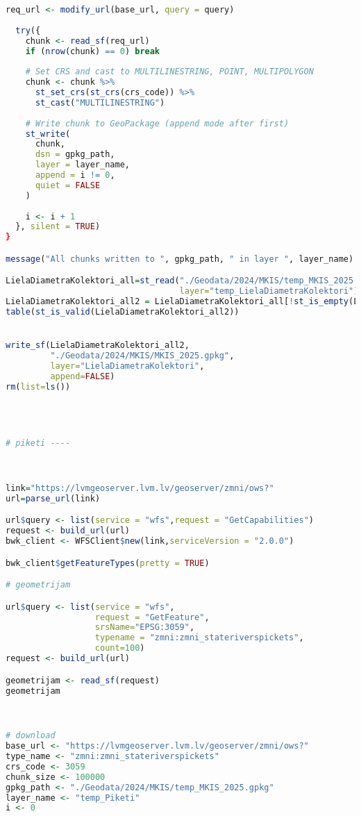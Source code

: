 \documentclass[
]{book}
\begin{document}
\begin{lstlisting}[language=R]
  req_url <- modify_url(base_url, query = query)
  
  try({
    chunk <- read_sf(req_url)
    if (nrow(chunk) == 0) break
    
    # Set CRS and cast to MULTILINESTRING, POINT, MULTIPOLYGON
    chunk <- chunk %>%
      st_set_crs(st_crs(crs_code)) %>%
      st_cast("MULTILINESTRING")
    
    # Write chunk to GeoPackage (append mode after first)
    st_write(
      chunk, 
      dsn = gpkg_path,
      layer = layer_name,
      append = i != 0,
      quiet = FALSE
    )
    
    i <- i + 1
  }, silent = TRUE)
}

message("All chunks written to ", gpkg_path, " in layer ", layer_name)

LielaDiametraKolektori_all=st_read("./Geodata/2024/MKIS/temp_MKIS_2025.gpkg",
                                   layer="temp_LielaDiametraKolektori")
LielaDiametraKolektori_all2 = LielaDiametraKolektori_all[!st_is_empty(LielaDiametraKolektori_all),,drop=FALSE] # 0
table(st_is_valid(LielaDiametraKolektori_all2))


write_sf(LielaDiametraKolektori_all2,
         "./Geodata/2024/MKIS/MKIS_2025.gpkg",
         layer="LielaDiametraKolektori",
         append=FALSE)
rm(list=ls())




# piketi ----



link="https://lvmgeoserver.lvm.lv/geoserver/zmni/ows?"
url=parse_url(link)

url$query <- list(service = "wfs",request = "GetCapabilities")
request <- build_url(url)
bwk_client <- WFSClient$new(link,serviceVersion = "2.0.0")

bwk_client$getFeatureTypes(pretty = TRUE)

# geometrijam

url$query <- list(service = "wfs",
                  request = "GetFeature",
                  srsName="EPSG:3059",
                  typename = "zmni:zmni_stateriverspickets",
                  count=100)
request <- build_url(url)

geometrijam <- read_sf(request)
geometrijam



# download
base_url <- "https://lvmgeoserver.lvm.lv/geoserver/zmni/ows?"
type_name <- "zmni:zmni_stateriverspickets"
crs_code <- 3059
chunk_size <- 100000
gpkg_path <- "./Geodata/2024/MKIS/temp_MKIS_2025.gpkg"
layer_name <- "temp_Piketi"
i <- 0


\end{lstlisting}
\end{document}
